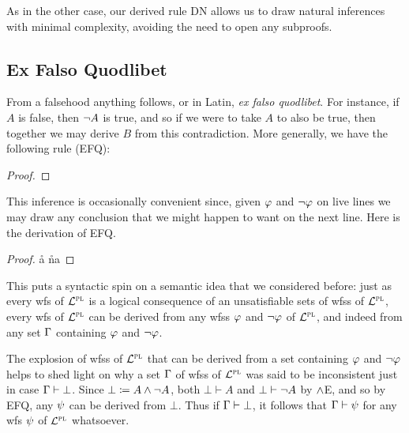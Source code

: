 As in the other case, our derived rule DN allows us to draw natural inferences with minimal complexity, avoiding the need to open any subproofs.




\subsection{Ex Falso Quodlibet}
  \label{EFQ}

From a falsehood anything follows, or in Latin, \textit{ex falso quodlibet}.
For instance, if $A$ is false, then $\neg A$ is true, and so if we were to take $A$ to also be true, then together we may derive $B$ from this contradiction. 
More generally, we have the following rule (EFQ):

\begin{proof}
\end{proof}

This inference is occasionally convenient since, given $\varphi$ and $\neg\varphi$ on live lines we may draw any conclusion that we might happen to want on the next line. 
Here is the derivation of EFQ.

\begin{proof}
  \open 
     
     \r{a}
     \r{na}
  \close
   
\end{proof}

This puts a syntactic spin on a semantic idea that we considered before: just as every wfs of $\mathcal{L}^{\textsc{pl}}$ is a logical consequence of an unsatisfiable sets of wfss of $\mathcal{L}^{\textsc{pl}}$, every wfs of $\mathcal{L}^{\textsc{pl}}$ can be derived from any wfss $\varphi$ and $\neg\varphi$ of $\mathcal{L}^{\textsc{pl}}$, and indeed from any set $\Gamma$ containing $\varphi$ and $\neg\varphi$. 

The explosion of wfss of $\mathcal{L}^{\textsc{pl}}$ that can be derived from a set containing $\varphi$ and $\neg \varphi$ helps to shed light on why a set $\Gamma$ of wfss of $\mathcal{L}^{\textsc{pl}}$ was said to be inconsistent just in case $\Gamma \vdash \bot$.
Since $\bot \coloneq A \wedge \neg A$, both $\bot \vdash A$ and $\bot \vdash \neg A$ by $\wedge$E, and so by EFQ, any $\psi$ can be derived from $\bot$. 
Thus if $\Gamma \vdash \bot$, it follows that $\Gamma \vdash \psi$ for any wfs $\psi$ of $\mathcal{L}^{\textsc{pl}}$ whatsoever. 





